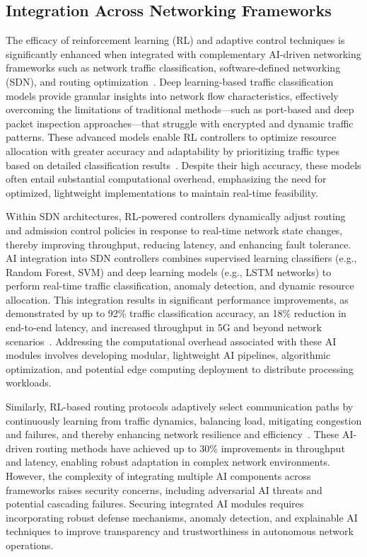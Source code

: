 \documentclass[sigconf]{acmart}
\begin{document}
\subsection{Integration Across Networking Frameworks}

The efficacy of reinforcement learning (RL) and adaptive control techniques is significantly enhanced when integrated with complementary AI-driven networking frameworks such as network traffic classification, software-defined networking (SDN), and routing optimization~\cite{ref51,ref52,ref53}. Deep learning-based traffic classification models provide granular insights into network flow characteristics, effectively overcoming the limitations of traditional methods—such as port-based and deep packet inspection approaches—that struggle with encrypted and dynamic traffic patterns. These advanced models enable RL controllers to optimize resource allocation with greater accuracy and adaptability by prioritizing traffic types based on detailed classification results~\cite{ref51}. Despite their high accuracy, these models often entail substantial computational overhead, emphasizing the need for optimized, lightweight implementations to maintain real-time feasibility.

Within SDN architectures, RL-powered controllers dynamically adjust routing and admission control policies in response to real-time network state changes, thereby improving throughput, reducing latency, and enhancing fault tolerance. AI integration into SDN controllers combines supervised learning classifiers (e.g., Random Forest, SVM) and deep learning models (e.g., LSTM networks) to perform real-time traffic classification, anomaly detection, and dynamic resource allocation. This integration results in significant performance improvements, as demonstrated by up to 92\% traffic classification accuracy, an 18\% reduction in end-to-end latency, and increased throughput in 5G and beyond network scenarios~\cite{ref52}. Addressing the computational overhead associated with these AI modules involves developing modular, lightweight AI pipelines, algorithmic optimization, and potential edge computing deployment to distribute processing workloads.

Similarly, RL-based routing protocols adaptively select communication paths by continuously learning from traffic dynamics, balancing load, mitigating congestion and failures, and thereby enhancing network resilience and efficiency~\cite{ref53}. These AI-driven routing methods have achieved up to 30\% improvements in throughput and latency, enabling robust adaptation in complex network environments. However, the complexity of integrating multiple AI components across frameworks raises security concerns, including adversarial AI threats and potential cascading failures. Securing integrated AI modules requires incorporating robust defense mechanisms, anomaly detection, and explainable AI techniques to improve transparency and trustworthiness in autonomous network operations.
\end{document}
